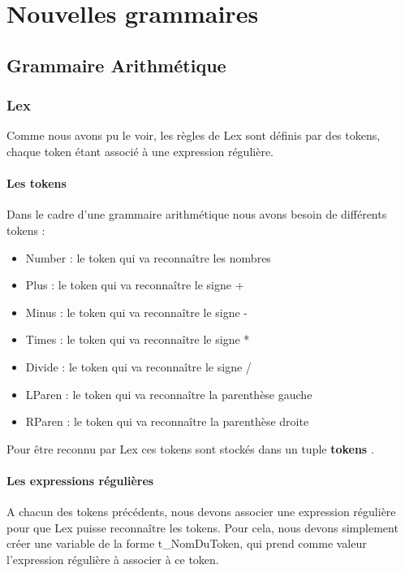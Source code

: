 \documentclass[a4paper,12pt]{article}
\begin{document}
\section{Nouvelles grammaires}

	\subsection{Grammaire Arithmétique}

		\subsubsection{Lex}
			
			Comme nous avons pu le voir, les règles de Lex sont définis par des tokens, chaque token étant associé à une expression régulière. 

			\paragraph{Les tokens}

				Dans le cadre d'une grammaire arithmétique nous avons besoin de différents tokens : 
				\begin{itemize}
					\item Number : le token qui va reconnaître les nombres
					\item Plus : le token qui va reconnaître le signe +
					\item Minus : le token qui va reconnaître le signe -
					\item Times : le token qui va reconnaître le signe *
					\item Divide : le token qui va reconnaître le signe /
					\item LParen : le token qui va reconnaître la parenthèse gauche
					\item RParen : le token qui va reconnaître la parenthèse droite
				\end{itemize}

				Pour être reconnu par Lex ces tokens sont stockés dans un tuple \textbf{tokens} .

			\paragraph{Les expressions régulières}

				A chacun des tokens précédents, nous devons associer une expression régulière pour que Lex puisse reconnaître les tokens.
				Pour cela, nous devons simplement créer une variable de la forme t\_NomDuToken, qui prend comme valeur l'expression régulière à associer à ce token.
\end{document}
